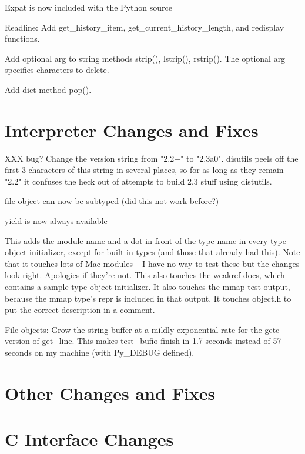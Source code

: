 \documentclass{howto}
\begin{document}
Expat is now included with the Python source

Readline: Add get_history_item, get_current_history_length, and
redisplay functions.

Add optional arg to string methods strip(), lstrip(), rstrip().
The optional arg specifies characters to delete.

Add dict method pop().

\section{Interpreter Changes and Fixes}

XXX bug?  Change the version string from "2.2+" to "2.3a0".  disutils peels off
the first 3 characters of this string in several places, so for as long
as they remain "2.2" it confuses the heck out of attempts to build 2.3
stuff using distutils.

file object can now be subtyped (did this not work before?)

yield is now always available

This adds the module name and a dot in front of the type name in every
type object initializer, except for built-in types (and those that
already had this).  Note that it touches lots of Mac modules -- I have
no way to test these but the changes look right.  Apologies if they're
not.  This also touches the weakref docs, which contains a sample type
object initializer.  It also touches the mmap test output, because the
mmap type's repr is included in that output.  It touches object.h to
put the correct description in a comment.

File objects: Grow the string buffer at a mildly exponential rate for
the getc version of get_line.  This makes test_bufio finish in 1.7
seconds instead of 57 seconds on my machine (with Py_DEBUG defined).

\section{Other Changes and Fixes}


\section{C Interface Changes}
\end{document}
